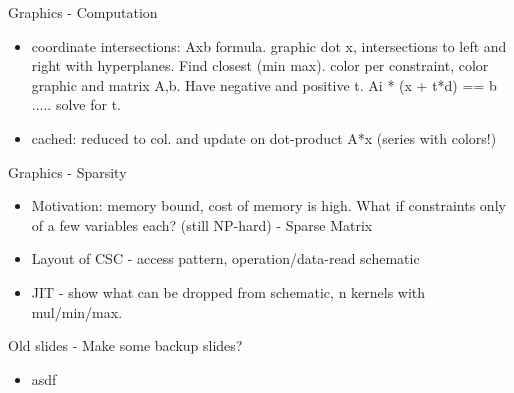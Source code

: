 \documentclass[table]{beamer}
\newcommand{\backupbegin}{
   \newcounter{finalframe}
   \setcounter{finalframe}{\value{framenumber}}
}
\newcommand{\backupend}{
   \setcounter{framenumber}{\value{finalframe}}
}
\begin{document}
\begin{frame}{Graphics - Computation}
	\begin{itemize}
	    \item coordinate intersections: Axb formula. graphic dot x, intersections to left and right with hyperplanes. Find closest (min max). color per constraint, color graphic and matrix A,b. Have negative and positive t. Ai * (x + t*d) == b ..... solve for t.
	    \item cached: reduced to col. and update on dot-product A*x (series with colors!)
	\end{itemize}
\end{frame}

\begin{frame}{Graphics - Sparsity}
	\begin{itemize}
	    \item Motivation: memory bound, cost of memory is high. What if constraints only of a few variables each? (still NP-hard) - Sparse Matrix
	    \item Layout of CSC - access pattern, operation/data-read schematic
	    \item JIT - show what can be dropped from schematic, n kernels with mul/min/max.
	\end{itemize}
\end{frame}

\backupbegin

\begin{frame}{Old slides - Make some backup slides?}
	\begin{itemize}
		\item asdf
	\end{itemize}
\end{frame}


\backupend
\end{document}
